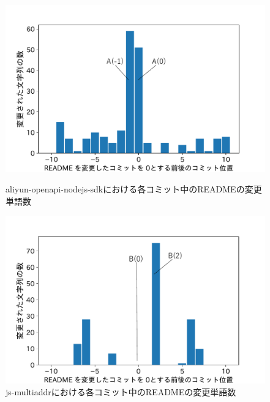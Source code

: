 \documentclass[uplatex,dvipdfmx,a4paper,twocolumn,base=11pt,jbase=11pt,ja=standard]{bxjsarticle}  %
\begin{document}
\begin{figure}[t]
\begin{center}
\includegraphics[width=1\linewidth]{1commit_use_aliyun_1.pdf}
\caption{aliyun-openapi-nodejs-sdkにおける各コミット中のREADMEの変更単語数}
\label{fig:aliyun}
\end{center}

\vspace{5mm}

\begin{center}
\includegraphics[width=1\linewidth]{1commit_use_js_1.pdf}
\caption{js-multiaddrにおける各コミット中のREADMEの変更単語数}
\label{fig:multiaddr}
\end{center}
\end{figure}
\end{document}
